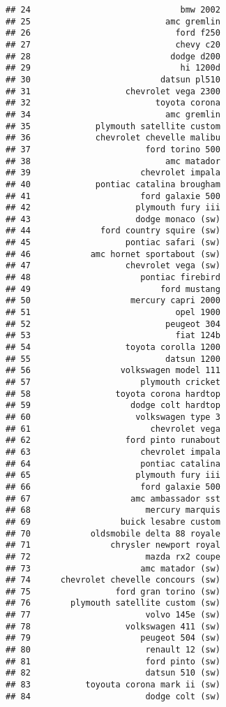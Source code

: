 \documentclass[
]{article}
\begin{document}
\begin{verbatim}
## 24                              bmw 2002
## 25                           amc gremlin
## 26                             ford f250
## 27                             chevy c20
## 28                            dodge d200
## 29                              hi 1200d
## 30                          datsun pl510
## 31                   chevrolet vega 2300
## 32                         toyota corona
## 34                           amc gremlin
## 35             plymouth satellite custom
## 36             chevrolet chevelle malibu
## 37                       ford torino 500
## 38                           amc matador
## 39                      chevrolet impala
## 40             pontiac catalina brougham
## 41                      ford galaxie 500
## 42                     plymouth fury iii
## 43                     dodge monaco (sw)
## 44              ford country squire (sw)
## 45                   pontiac safari (sw)
## 46            amc hornet sportabout (sw)
## 47                   chevrolet vega (sw)
## 48                      pontiac firebird
## 49                          ford mustang
## 50                    mercury capri 2000
## 51                             opel 1900
## 52                           peugeot 304
## 53                             fiat 124b
## 54                   toyota corolla 1200
## 55                           datsun 1200
## 56                  volkswagen model 111
## 57                      plymouth cricket
## 58                 toyota corona hardtop
## 59                    dodge colt hardtop
## 60                     volkswagen type 3
## 61                        chevrolet vega
## 62                   ford pinto runabout
## 63                      chevrolet impala
## 64                      pontiac catalina
## 65                     plymouth fury iii
## 66                      ford galaxie 500
## 67                    amc ambassador sst
## 68                       mercury marquis
## 69                  buick lesabre custom
## 70            oldsmobile delta 88 royale
## 71                chrysler newport royal
## 72                       mazda rx2 coupe
## 73                      amc matador (sw)
## 74      chevrolet chevelle concours (sw)
## 75                 ford gran torino (sw)
## 76        plymouth satellite custom (sw)
## 77                       volvo 145e (sw)
## 78                   volkswagen 411 (sw)
## 79                      peugeot 504 (sw)
## 80                       renault 12 (sw)
## 81                       ford pinto (sw)
## 82                       datsun 510 (sw)
## 83           toyouta corona mark ii (sw)
## 84                       dodge colt (sw)

\end{verbatim}
\end{document}
